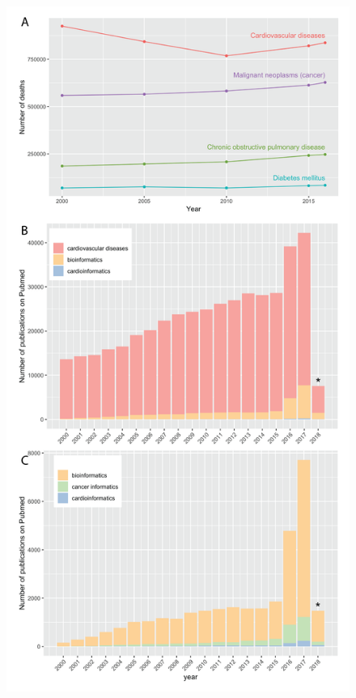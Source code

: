 \documentclass[letter]{bioinfo}
\begin{document}
\begin{figure}[!tpb]
	\centering
	\includegraphics[width=1\linewidth]{figure1}

\end{figure}
\end{document}
